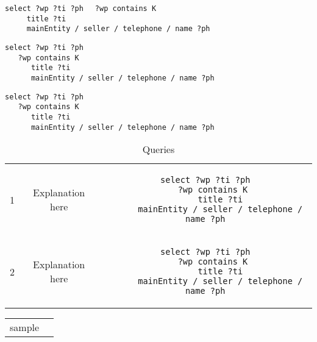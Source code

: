 \verb|select ?wp ?ti ?ph|
\verb|  ?wp contains K|\\
\verb|     title ?ti|\\
\verb|     mainEntity / seller / telephone / name ?ph|

\begin{lstlisting}
select ?wp ?ti ?ph
   ?wp contains K
      title ?ti
      mainEntity / seller / telephone / name ?ph
\end{lstlisting}

\begin{verbatim}
select ?wp ?ti ?ph
   ?wp contains K
      title ?ti
      mainEntity / seller / telephone / name ?ph
\end{verbatim}

\verbatimfont{\small}
\begin{table} 
    \begin{tabular}{ c c c }
        1 & Explanation here & 
\begin{minipage}{3in}\begin{verbatim}
select ?wp ?ti ?ph
   ?wp contains K
      title ?ti
      mainEntity / seller / telephone / name ?ph
\end{verbatim}\end{minipage}\\ 
        2 & Explanation here & 
\begin{minipage}{3in}\begin{lstlisting}
select ?wp ?ti ?ph
   ?wp contains K
      title ?ti
      mainEntity / seller / telephone / name ?ph
\end{lstlisting}\end{minipage}\\  
    \end{tabular} 
    \caption{Queries} 
\end{table}

\begin{tabular}{ ll }
sample &

\end{tabular}
